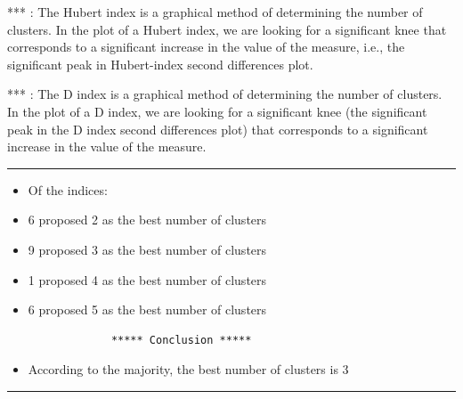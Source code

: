 *** : The Hubert index is a graphical method of determining the number
of clusters. In the plot of a Hubert index, we are looking for a significant knee
that corresponds to a significant increase in the value of the measure,
i.e., the significant peak in Hubert-index second differences plot.

*** : The D index is a graphical method of determining the number of
clusters. In the plot of a D index, we are looking for a significant knee (the
significant peak in the D index second differences plot) that corresponds to
a significant increase in the value of the measure.

\begin{center}\rule{0.5\linewidth}{0.5pt}\end{center}

\begin{itemize}
\item
  Of the indices:\\
\item
  6 proposed 2 as the best number of clusters
\item
  9 proposed 3 as the best number of clusters
\item
  1 proposed 4 as the best number of clusters
\item
  6 proposed 5 as the best number of clusters

\begin{verbatim}
             ***** Conclusion *****                            
\end{verbatim}
\item
  According to the majority, the best number of clusters is 3
\end{itemize}

\begin{center}\rule{0.5\linewidth}{0.5pt}\end{center}

\begin{Shaded}
\begin{Highlighting}[]
\OtherTok{\textless{}{-}}\SpecialCharTok{$}\NormalTok{Best.nc[}\NormalTok{]}

\OtherTok{\textless{}{-}}  \NormalTok{)}
\end{Highlighting}
\end{Shaded}

